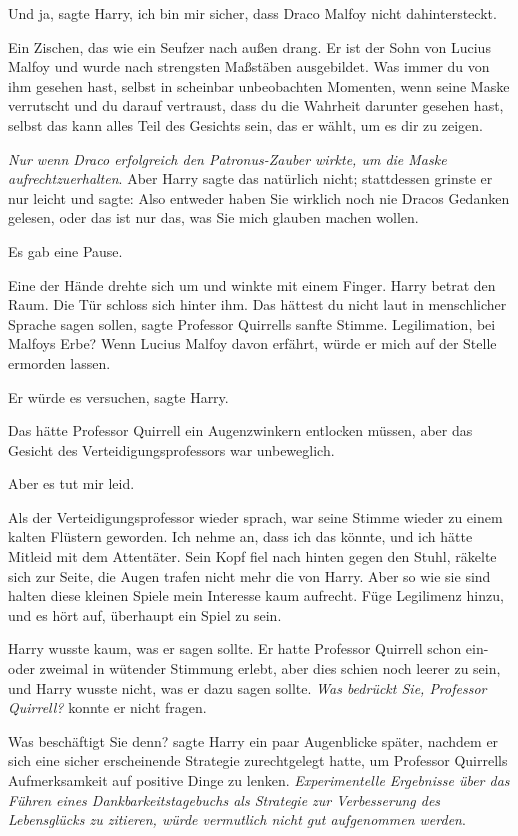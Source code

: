 \glqq{}Und ja\grqq{}, sagte Harry, \glqq{}ich bin mir sicher, dass Draco Malfoy
nicht dahintersteckt.\grqq{}

Ein Zischen, das wie ein Seufzer nach außen drang. \glqq{}Er ist der Sohn von
Lucius Malfoy und wurde nach strengsten Maßstäben ausgebildet. Was immer du von
ihm gesehen hast, selbst in scheinbar unbeobachten Momenten, wenn seine Maske
verrutscht und du darauf vertraust, dass du die Wahrheit darunter gesehen hast,
selbst das kann alles Teil des Gesichts sein, das er wählt, um es dir zu
zeigen.\grqq{}

\emph{Nur wenn Draco erfolgreich den Patronus-Zauber wirkte, um die Maske
aufrechtzuerhalten}. Aber Harry sagte das natürlich nicht; stattdessen grinste
er nur leicht und sagte: \glqq{}Also entweder haben Sie wirklich noch nie Dracos
Gedanken gelesen, oder das ist nur das, was Sie mich glauben machen
wollen.\grqq{}

Es gab eine Pause.

Eine der Hände drehte sich um und winkte mit einem Finger. Harry betrat den
Raum. Die Tür schloss sich hinter ihm. \glqq{}Das hättest du nicht laut in
menschlicher Sprache sagen sollen\grqq{}, sagte Professor Quirrells sanfte
Stimme. \glqq{}Legilimation, bei Malfoys Erbe? Wenn Lucius Malfoy davon erfährt,
würde er mich auf der Stelle ermorden lassen.\grqq{}

\glqq{}Er würde es versuchen\grqq{}, sagte Harry.

Das hätte Professor Quirrell ein Augenzwinkern entlocken müssen, aber das
Gesicht des Verteidigungsprofessors war unbeweglich.

\glqq{}Aber es tut mir leid.\grqq{}

Als der Verteidigungsprofessor wieder sprach, war seine Stimme wieder zu einem
kalten Flüstern geworden. \glqq{}Ich nehme an, dass ich das könnte, und ich hätte
Mitleid mit dem Attentäter.\grqq{} Sein Kopf fiel nach hinten gegen den Stuhl,
räkelte sich zur Seite, die Augen trafen nicht mehr die von Harry. \glqq{}Aber so
wie sie sind halten diese kleinen Spiele mein Interesse kaum aufrecht. Füge
Legilimenz hinzu, und es hört auf, überhaupt ein Spiel zu sein.\grqq{}

Harry wusste kaum, was er sagen sollte. Er hatte Professor Quirrell schon ein-
oder zweimal in wütender Stimmung erlebt, aber dies schien noch leerer zu sein,
und Harry wusste nicht, was er dazu sagen sollte. \emph{Was bedrückt Sie,
Professor Quirrell?} konnte er nicht fragen.

\glqq{}Was beschäftigt Sie denn?\grqq{} sagte Harry ein paar Augenblicke später,
nachdem er sich eine sicher erscheinende Strategie zurechtgelegt hatte, um
Professor Quirrells Aufmerksamkeit auf positive Dinge zu lenken.
\emph{Experimentelle Ergebnisse über das Führen eines Dankbarkeitstagebuchs als
Strategie zur Verbesserung des Lebensglücks zu zitieren, würde vermutlich nicht
gut aufgenommen werden}.

